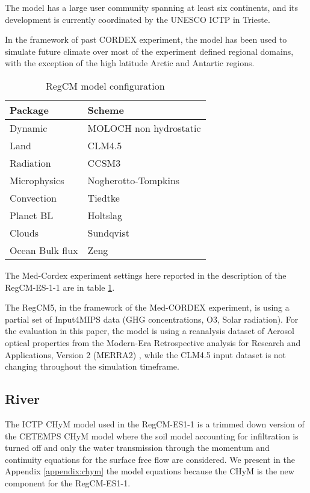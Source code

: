 \documentclass[journal abbreviation, manuscript]{copernicus}
\begin{document}
The model has a large user community spanning at least six continents, and its
development is currently coordinated by the UNESCO ICTP in Trieste.

In the framework of past CORDEX experiment, the model has been used to simulate
future climate over most of the experiment defined regional domains, with the
exception of the high latitude Arctic and Antartic regions.

\begin{table}[]
    \begin{tabular}{|l|l|}
        \hline
        Package & Scheme \\
        \hline
        Dynamic & MOLOCH non hydrostatic \\
        Land & CLM4.5 \\
        Radiation & CCSM3 \\
        Microphysics & Nogherotto-Tompkins \\
        Convection & Tiedtke \\
        Planet BL & Holtslag \\
        Clouds & Sundqvist \\
        Ocean Bulk flux & Zeng \\
        \hline
  \end{tabular}
    \caption{RegCM model configuration}
    \label{table:regcm_conf}
\end{table}

The Med-Cordex experiment settings here reported in the description of the
RegCM-ES-1-1 are in table \ref{table:regcm_conf}.

The RegCM5, in the framework of the Med-CORDEX experiment, is using a partial
set of Input4MIPS data (GHG concentrations, O3, Solar radiation). For the
evaluation in this paper, the model is using a reanalysis dataset of Aerosol
optical properties from the Modern-Era Retrospective analysis for Research
and Applications, Version 2 (MERRA2) \citep{randles-2017,buchard-2017},
while the CLM4.5 input dataset is not changing throughout the simulation
timeframe.

\subsection{River}

The ICTP CHyM model used in the RegCM-ES1-1 is a trimmed down version of the
CETEMPS CHyM model where the soil model accounting for infiltration is turned
off and only the water transmission through the momentum and continuity
equations for the surface free flow are considered. We present in the
Appendix \ref{appendix:chym} the model equations because the CHyM is the new
component for the RegCM-ES1-1.
\end{document}
